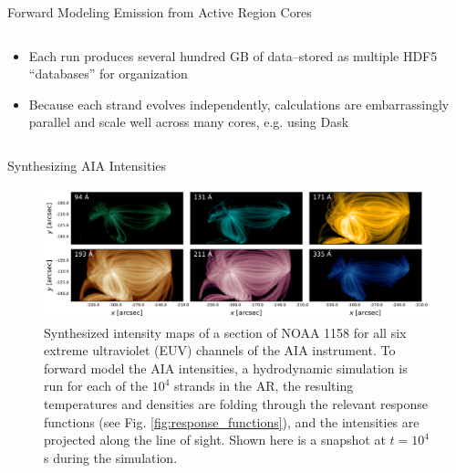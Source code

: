\documentclass[final]{beamer}
\begin{document}
\begin{frame}
\begin{columns}[T]
\begin{column}{0.49\linewidth}
\begin{block}{Forward Modeling Emission from Active Region Cores}
\begin{columns}[c]
\begin{column}{0.49\columnwidth}
\begin{itemize}
\begin{enumerate}
                    \item Map temperature and density from each strand into the extrapolated field such that we have temperature and density in time and 3D cartesian space, $T(x,y,z,t)$ and $n(x,y,z,t)$
                    \item At each timestep, calculate the intensity in each EUV channel, $c$, using the AIA response functions (see Fig. \ref{fig:response_functions}) and taking the LOS to be along the $z$-axis,
                    \begin{equation}
                        I_c(x,y,t) = \int\mathrm{d}z\,n^2(x,y,z,t)K_c(T(x,y,z,t)),
                    \end{equation}
                    where $K_c$ is the temperture response function of channel $c$.
                    \item Apply a gaussian filter to each synthesized image to simulate the point spread function of the instrument
                \end{enumerate}
                \item Each run produces several hundred GB of data--stored as multiple HDF5 ``databases'' for organization
                \item Because each strand evolves independently, calculations are embarrassingly parallel and scale well across many cores, e.g. using Dask \citep{dask_development_team_dask:_2016}
            \end{itemize}
        \end{column}
    \end{columns}
    \end{block}
    \begin{block}{Synthesizing AIA Intensities}
        \begin{figure}
            \includegraphics[width=\columnwidth]{figures/aia_intensities.pdf}
            \caption{Synthesized intensity maps of a section of NOAA 1158 for all six extreme ultraviolet (EUV) channels of the AIA instrument. To forward model the AIA intensities, a hydrodynamic simulation is run for each of the $10^4$ strands in the AR, the resulting temperatures and densities are folding through the relevant response functions (see Fig. \ref{fig:response_functions}), and the intensities are projected along the line of sight. Shown here is a snapshot at $t=10^4$ s during the simulation.} 

\end{figure}
\end{block}
\end{column}
\end{columns}
\end{frame}
\end{document}

